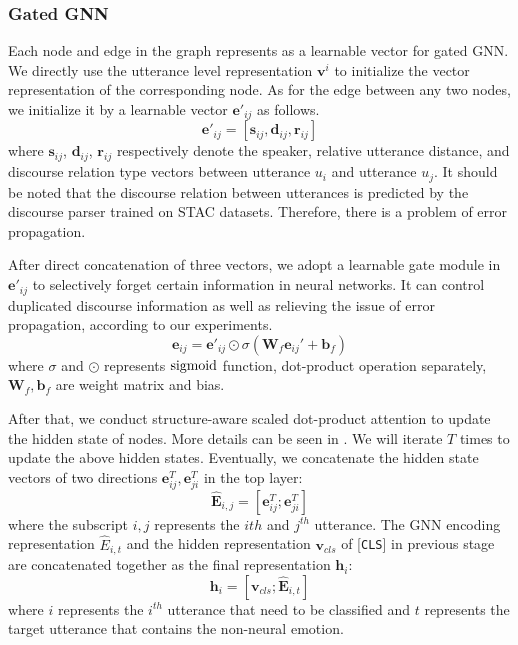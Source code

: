 \documentclass[11pt]{article}
\begin{document}
\subsubsection{Gated GNN}
Each node and edge in the graph represents as a learnable vector for gated GNN.
We directly use the utterance level representation $\mathbf{v}^i$ to initialize the vector representation of the corresponding node.
As for the edge between any two nodes, we initialize it by a learnable vector $\mathbf{e'}_{ij}$ as follows.
\begin{equation}
\mathbf{e'}_{ij}=[\mathbf{s}_{ij}, \mathbf{d}_{ij}, \mathbf{r}_{ij}]
\end{equation}
where $\mathbf{s}_{ij}$, $\mathbf{d}_{ij}$, $\mathbf{r}_{ij}$ respectively denote the speaker, relative utterance distance, and discourse relation type vectors between utterance $u_i$ and utterance $u_j$. 
It should be noted that the discourse relation between utterances is predicted by the discourse parser trained on STAC datasets.
Therefore, there is a problem of error propagation.

After direct concatenation of three vectors, we adopt a learnable gate module in $\mathbf{e'}_{ij}$ to selectively forget certain information in neural networks.
It can control duplicated discourse information as well as relieving the issue of error propagation, according to our experiments. 
\begin{equation}
    \mathbf{e}_{ij}=\mathbf{e'}_{ij}\odot\sigma(\mathbf{W}_f\mathbf{e}_{ij}'+\mathbf{b}_f)
\end{equation}
where $\sigma$ and $\odot$ represents $\rm{sigmoid}$ function, dot-product operation separately, $\mathbf{W}_f,\mathbf{b}_f$ are weight matrix and bias.

After that, we conduct structure-aware scaled dot-product attention to update the hidden state of nodes.
More details can be seen in \citet{wang2021structure}. 
We will iterate $T$ times to update the above hidden states.
Eventually, we concatenate the hidden state vectors of two directions $\mathbf{e}_{ij}^{T}, \mathbf{e}_{ji}^{T}$ in the top layer:
\begin{equation}
\mathbf{\widehat{E}}_{i,j}=[\mathbf{e}_{ij}^{T};\mathbf{e}_{ji}^{T}]
\end{equation}
where the subscript $i,j$ represents the $i{th}$ and $j^{th}$ utterance.
The GNN encoding representation $\widehat{E}_{i,t}$ and the hidden representation $\mathbf{v}_{cls}$ of [\texttt{CLS}] in previous stage are concatenated together as the final representation $\mathbf{h}_i$:
\begin{equation}
\mathbf{h}_i=[\mathbf{v}_{cls};\mathbf{\widehat{E}}_{i,t}]
\end{equation}
where $i$ represents the $i^{th}$ utterance that need to be classified and $t$ represents the target utterance that contains the non-neural emotion.
\end{document}
